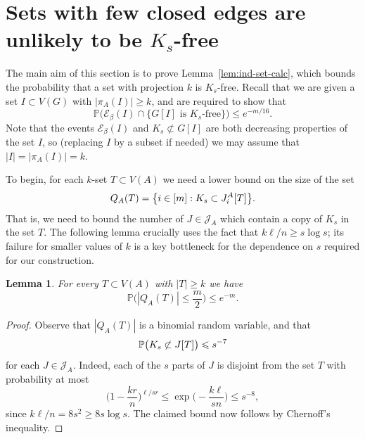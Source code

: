 \documentclass[10pt,a4paper]{amsart}
\newcommand\pig[1]{\scalerel*[5pt]{\normalsize#1}{%
  \ensurestackMath{\addstackgap[0.5pt]{\normalsize#1}}}}
\newtheorem{lemma}[theorem]{Lemma}
\numberwithin{theorem}{section}
\renewcommand{\(}{\bigl(}
\renewcommand{\)}{\bigr)\vphantom{)}}
\newcommand{\cE}{\mathcal E}
\newcommand{\cJ}{\mathcal J}
\def\1{\mathbbm{1}}
\renewcommand{\le}{\leqslant}
\renewcommand{\ge}{\geqslant}
\renewcommand{\Pr}{\mathbb{P}}
\begin{document}
\section{Sets with few closed edges are unlikely to be $K_s$-free}\label{sec:prob:bound}

The main aim of this section is to prove Lemma~\ref{lem:ind-set-calc}, which bounds the probability that a set with projection $k$ is $K_s$-free. Recall that we are given a set $I \subset V(G)$ with $|\pi_A(I)| \ge k$, and are required to show that 
$$\Pr\Big( \cE_\beta(I) \cap \big\{ G[I] \text{ is $K_s$-free} \big\} \Big) \le e^{-m/16}.$$
Note that the events $\cE_\beta(I)$ and $K_s \not\subset G[I]$ are both decreasing properties of the set $I$, so (replacing $I$ by a subset if needed) we may assume that $|I| = |\pi_A(I)| = k$. 

To begin, for each $k$-set $T \subset V(A)$ we need a lower bound on the size of the set
$$Q_A(T) = \big\{ i \in [m] :  K_s \subset J^A_i\pig[ T \pig] \big\}.$$
That is, we need to bound the number of $J \in \cJ_A$ which contain a copy of $K_s$ in the set $T$. The following lemma crucially uses the fact that $k \ell / n \ge s \log s$; its failure for smaller values of $k$ is a key bottleneck for the dependence on $s$ required for our construction. 

\begin{lemma}\label{lem:S-hit-I} 
For every $T \subset V(A)$ with $|T| \ge k$ we have 
$$\Pr\bigg( |Q_A(T)| \le \frac{m}{2} \bigg) \le e^{-m}.$$
\end{lemma}

\begin{proof} 
Observe that $|Q_A(T)|$ is a binomial random variable, and that 
$$\Pr\big( K_s \not\subset J\pig[ T \pig] \big) \le s^{-7}$$ 
for each $J \in \cJ_A$. Indeed, each of the $s$ parts of $J$ is disjoint from the set $T$ with probability at most
$$\bigg( 1 - \frac{kr}{n} \bigg)^{\ell/sr} \le \exp\bigg( - \frac{k \ell}{sn} \bigg) \le s^{-8},$$
since $k \ell / n = 8 s^2 \ge 8 s \log s$. The claimed bound now follows by Chernoff's inequality.
\end{proof}


\end{document}
